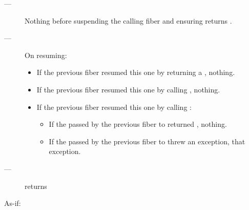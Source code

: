 \except
\begin{description}
    \item[---] Nothing before suspending the calling fiber and
               ensuring  returns .
    \item[---] On resuming:
    \begin{itemize}
        \item If the previous fiber resumed this one by returning a \fiber,
              nothing.
        \item If the previous fiber resumed this one by calling \someresume,
              nothing.
        \item If the previous fiber resumed this one by calling \anyresumewith:
        \begin{itemize}
            \item If the  passed by the previous fiber
                  to \anyresumewith returned \fiber, nothing.
            \item If the  passed by the previous fiber
                  to \anyresumewith threw an exception, that exception.
        \end{itemize}
    \end{itemize}
\end{description}

\postcond
\begin{description}
    \item[---]  returns 
\end{description}




\effects
As-if:\\


